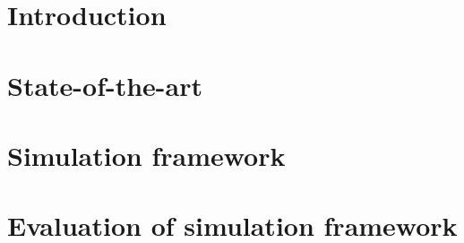 \documentclass[draft,final]{vutinfth} %
\begin{document}
\frontmatter %

\addstatementpage

\begin{danksagung*}

\end{danksagung*}

\begin{acknowledgements*}

\end{acknowledgements*}

\begin{kurzfassung}

\end{kurzfassung}

\begin{abstract}

\end{abstract}


\tableofcontents %

\mainmatter

\chapter{Introduction}


\chapter{State-of-the-art} \label{chap:state}


\chapter{Simulation framework}


\chapter{Evaluation of simulation framework}

\end{document}
